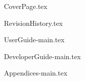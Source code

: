 \documentclass[11pt,fleqn]{article}
\begin{document}
\setcounter{secnumdepth}{0}
\setlength{\parindent}{0pt}


{CoverPage.tex}


\newpage
\renewcommand{\contentsname}{\centerline{Contents}}
\tableofcontents

\setlength{\parskip}{6pt}


{RevisionHistory.tex}


{UserGuide-main.tex}


{DeveloperGuide-main.tex}


\clearpage





{Appendices-main.tex}
\end{document}
